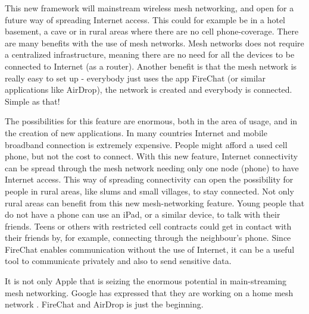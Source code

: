 This new framework will mainstream wireless mesh networking, and open for a future way of spreading Internet access. This could for example be in a hotel basement, a cave or in rural areas where there are no cell phone-coverage. There are many benefits with the use of mesh networks. Mesh networks does not require a centralized infrastructure, meaning there are no need for all the devices to be connected to Internet (as a router). Another benefit is that the mesh network is really easy to set up - everybody just uses the app FireChat (or similar applications like AirDrop), the network is created and everybody is connected. Simple as that! 

The possibilities for this feature are enormous, both in the area of usage, and in the creation of new applications. In many countries Internet and mobile broadband connection is extremely expensive. People might afford a used cell phone, but not the cost to connect. With this new feature, Internet connectivity can be spread through the mesh network needing only one node (phone) to have Internet access. This way of spreading connectivity can open the possibility for people in rural areas, like slums and small villages, to stay connected. Not only rural areas can benefit from this new mesh-networking feature. Young people that do not have a phone can use an iPad, or a similar device, to talk with their friends. Teens or others with restricted cell contracts could get in contact with their friends by, for example, connecting through the neighbour's phone. Since FireChat enables communication without the use of Internet, it can be a useful tool to communicate privately and also to send sensitive data.
 
It is not only Apple that is seizing the enormous potential in main-streaming mesh networking. Google has expressed that they are working on a home mesh network \cite{googleMesh}. FireChat and AirDrop is just the beginning.